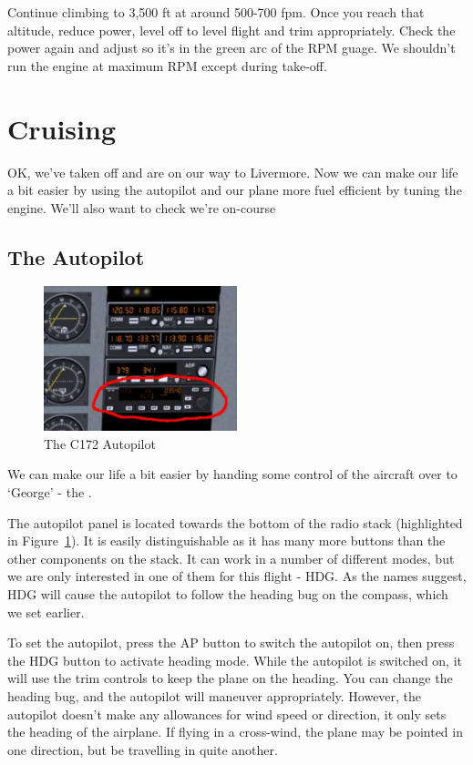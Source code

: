 Continue climbing to 3,500 ft at around 500-700 fpm. Once you reach that altitude,
reduce power, level off to level flight and trim appropriately. Check the power
again and adjust so it's in the green arc of the RPM guage. We shouldn't run the
engine at maximum RPM except during take-off.

\section{Cruising}

OK, we've taken off and are on our way to Livermore. Now we can make our life a
bit easier by using the autopilot and our plane more fuel efficient by tuning
the engine. We'll also want to check we're on-course

\subsection{The Autopilot}

\begin{figure}[!htp]
\centering
\includegraphics[width=0.5\textwidth]{autopilot}
\caption{The C172 Autopilot\label{autopilot}}
\end{figure}

We can make our life a bit easier by handing some control of the aircraft over
to `George' - the .

The autopilot panel is located towards the bottom of the radio stack
(highlighted in Figure~\ref{autopilot}). It is easily distinguishable as
it has many more buttons than the other components on the stack. It can
work in a number of different modes, but we are only interested in one of
them for this flight - HDG. As the names suggest, HDG will cause the
autopilot to follow the heading bug on the compass, which we set earlier.

To set the autopilot, press the AP button to switch the autopilot on,
then press the HDG button to activate heading mode. While the autopilot
is switched on, it will use the trim controls to keep the
plane on the heading. You can change the heading bug, and the autopilot
will maneuver appropriately. However, the autopilot doesn't make any
allowances for wind speed or direction, it only sets the heading of
the airplane. If flying in a cross-wind, the plane may be pointed in
one direction, but be travelling in quite another.

